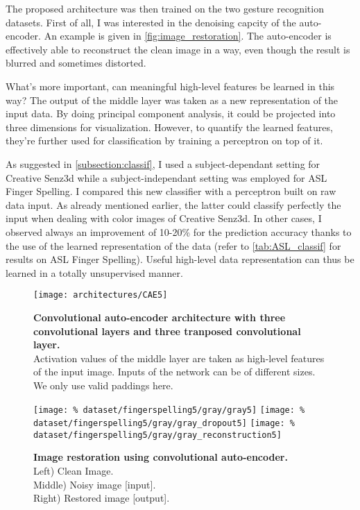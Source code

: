 The proposed architecture was then trained on the two gesture recognition
datasets. First of all, I was interested in the denoising capcity of
the auto-encoder. An example is given in \autoref{fig:image_restoration}.
The auto-encoder is effectively able to reconstruct the clean image in
a way, even though the result is blurred and sometimes distorted.

What's more important, can meaningful high-level features be
learned in this way? The output of the middle layer was taken as a
new representation of the input data.
By doing principal component analysis, it could be projected into
three dimensions for visualization.
However, to quantify the learned features, they're further used for
classification by training a perceptron on top of it.

As suggested in \ref{subsection:classif}, I used a subject-dependant setting
for Creative Senz3d while a subject-independant setting was employed
for ASL Finger Spelling. I compared this new classifier with a
perceptron built on raw data input. As already mentioned earlier, the
latter could classify perfectly the input when dealing with color images
of Creative Senz3d. In other cases, I observed always an improvement
of 10-20\% for the prediction accuracy thanks to the use of the
learned representation of the data (refer to \autoref{tab:ASL_classif}
for results on ASL Finger Spelling). Useful high-level data representation
can thus be learned in a totally unsupervised manner.

\begin{figure}[H]
  \centering
  \texttt{[image: architectures/CAE5]}
  \caption{%
    \textbf{Convolutional auto-encoder architecture with 
      three convolutional layers and three tranposed convolutional
      layer.}\\[0.1em]
    Activation values of the middle layer are taken as 
      high-level features of the input image. Inputs of the network
      can be of different sizes. We only use valid paddings here.}
  \label{fig:CAE5}
\end{figure}

\begin{figure}[H]
  \centering
  \hfill
  \texttt{[image: \%
    dataset/fingerspelling5/gray/gray5]}
  \hfill
  \texttt{[image: \%
    dataset/fingerspelling5/gray/gray\_dropout5]}
  \hfill
  \texttt{[image: \%
    dataset/fingerspelling5/gray/gray\_reconstruction5]}
  \caption{%
    \textbf{Image restoration using convolutional auto-encoder.}\\[0.1em]
      Left) Clean Image.\\[0.1em]
      Middle) Noisy image [input].\\[0.1em]
      Right) Restored image [output].}
  \label{fig:image_restoration}
\end{figure}

